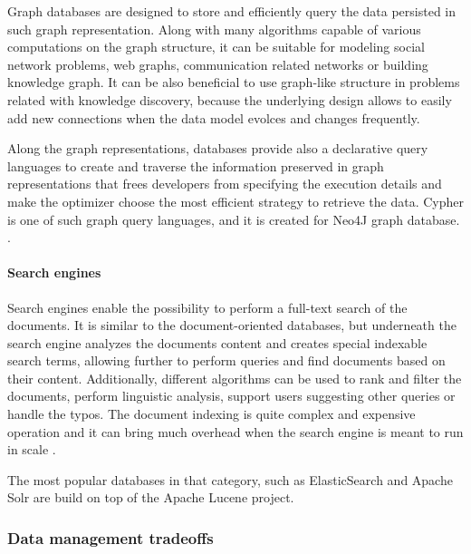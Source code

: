 Graph databases are designed to store and efficiently query the data persisted in such graph representation. Along with many algorithms capable of various computations on the graph structure, it can be suitable for modeling social network problems, web graphs, communication related networks or building knowledge graph. It can be also beneficial to use graph-like structure in problems related with knowledge discovery, because the underlying design allows to easily add new connections when the data model evolces and changes frequently.

Along the graph representations, databases provide also a declarative query languages to create and traverse the information preserved in graph representations that frees developers from specifying the execution details and make the optimizer choose the most efficient strategy to retrieve the data. Cypher is one of such graph query languages, and it is created for Neo4J graph database. \cite{DesignDataIntensiveApplications}.

\paragraph*{Search engines}

Search engines enable the possibility to perform a full-text search of the documents. It is similar to the document-oriented databases, but underneath the search engine analyzes the documents content and creates special indexable search terms, allowing further to perform queries and find documents based on their content. Additionally, different algorithms can be used to rank and filter the documents, perform linguistic analysis, support users suggesting other queries or handle the typos. The document indexing is quite complex and expensive operation and it can bring much overhead when the search engine is meant to run in scale \cite{DesignDataIntensiveApplications}. 

The most popular databases in that category, such as ElasticSearch and Apache Solr are build on top of the Apache Lucene project.

\subsubsection{Data management tradeoffs}



